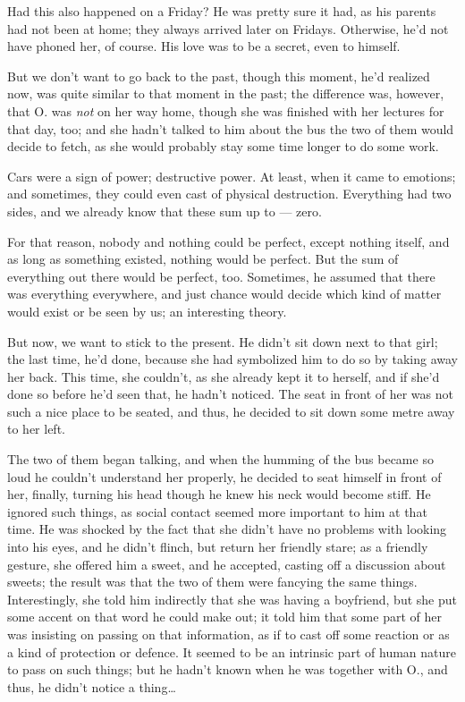 Had this also happened on a Friday? He was pretty sure it had, as his parents had not been at home; they always arrived later on Fridays. 
Otherwise, he'd not have phoned her, of course. 
His love was to be a secret, even to himself.

But we don't want to go back to the past, though this moment, he'd realized now, was quite similar to that moment in the past; the difference was, however, that O. was \emph{not} on her way home, though she was finished with her lectures for that day, too; and she hadn't talked to him about the bus the two of them would decide to fetch, as she would probably stay some time longer to do some work.

Cars were a sign of power; destructive power. At least, when it came to emotions; and sometimes, they could even cast of physical destruction. Everything had two sides, and we already know that these sum up to --- zero.

For that reason, nobody and nothing could be perfect, except nothing itself, and as long as something existed, nothing would be perfect. But the sum of everything out there would be perfect, too. 
Sometimes, he assumed that there was everything everywhere, and just chance would decide which kind of matter would exist or be seen by us; an interesting theory. 

But now, we want to stick to the present.
He didn't sit down next to that girl; the last time, he'd done, because she had symbolized him to do so by taking away her back. This time, she couldn't, as she already kept it to herself, and if she'd done so before he'd seen that, he hadn't noticed. The seat in front of her was not such a nice place to be seated, and thus, he decided to sit down some metre away to her left.

The two of them began talking, and when the humming of the bus became so loud he couldn't understand her properly, he decided to seat himself in front of her, finally, turning his head though he knew his neck would become stiff. He ignored such things, as social contact seemed more important to him at that time. He was shocked by the fact that she didn't have no problems with looking into his eyes, and he didn't flinch, but return her friendly stare; as a friendly gesture, she offered him a sweet, and he accepted, casting off a discussion about sweets; the result was that the two of them were fancying the same things. Interestingly, she told him indirectly that she was having a boyfriend, but she put some accent on that word he could make out; it told him that some part of her was insisting on passing on that information, as if to cast off some reaction or as a kind of protection or defence. It seemed to be an intrinsic part of human nature to pass on such things; but he hadn't known when he was together with O., and thus, he didn't notice a thing\ldots

